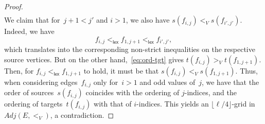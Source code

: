 \documentclass[10pt,a4paper]{amsart}
\newcommand{\adj}{Adj}
\newcommand{\floor}[1]{\lfloor #1 \rfloor}
\newcommand{\lex}{\mathsf{lex}}
\begin{document}
\begin{proof}
\begin{align}
    \end{align}
    We claim that for~$j+1<j'$ and $i>1$, we also have $s(f_{i,j}) <_V s(f_{i',j'})$.
    Indeed, we have
    \[ f_{i,j} <_\lex f_{1,j+1} <_\lex f_{i',j'}, \]
    which translates into the corresponding non-strict inequalities on the respective source vertices.
    But on the other hand,~\eqref{eq:ord-tgt} gives $t(f_{i,j}) >_V t(f_{1,j+1})$.
    Then, for $f_{i,j} <_\lex f_{1,j+1}$ to hold, it must be that $s(f_{i,j}) <_V s(f_{1,j+1})$.
    Thus, when considering edges~$f_{i,j}$ only for~$i>1$ and odd values of~$j$,
    we have that the order of sources~$s(f_{i,j})$ coincides with the ordering of $j$-indices,
    and the ordering of targets~$t(f_{i,j})$ with that of $i$-indices.
    This yields an $\floor{\ell/4}$-grid in~$\adj(E,<_V)$, a contradiction.
\end{proof}
\end{document}
